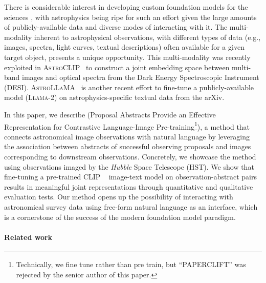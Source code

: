 \documentclass[10pt]{article} %
\newcommand{\hubble}{\emph{Hubble}\xspace}
\begin{document}
There is considerable interest in developing custom foundation models for the sciences \citep[e.g., ][]{batatia2023foundation,subramanian2023towards}, with astrophysics being ripe for such an effort given the large amounts of publicly-available data and diverse modes of interacting with it.
%
The multi-modality inherent to astrophysical observations, with different types of data (e.g., images, spectra, light curves, textual descriptions) often available for a given target object, presents a unique opportunity.
%
This multi-modality was recently exploited in \textsc{AstroCLIP}~\citep{lanusse2023astroclip} to construct a joint embedding space between multi-band images and optical spectra from the Dark Energy Spectroscopic Instrument (DESI).
%
\textsc{AstroLLaMA}~\citep{nguyen2023astrollama,perkowski2024astrollama} is another recent effort to fine-tune a publicly-available model (\textsc{Llama-2}) on astrophysics-specific textual data from the arXiv.

In this paper, we describe  (Proposal Abstracts Provide an Effective Representation for Contrastive Language-Image Pre-training\footnote{Technically, we fine tune rather than pre train, but ``PAPERCLIFT'' was rejected by the senior author of this paper.}), a method that connects astronomical image observations with natural language by leveraging the association between abstracts of successful observing proposals and images corresponding to downstream observations. 
%
Concretely, we showcase the method using observations imaged by the \hubble Space Telescope (HST).
%
We show that fine-tuning a pre-trained CLIP ~\citep[Contrastive Language-Image Pre-training; ][]{radford2021learning} image-text model on observation-abstract pairs results in meaningful joint representations through quantitative and qualitative evaluation tests.
%
Our method opens up the possibility of interacting with astronomical survey data using free-form natural language as an interface, which is a cornerstone of the success of the modern foundation model paradigm.
%

\paragraph*{Related work}
\end{document}
